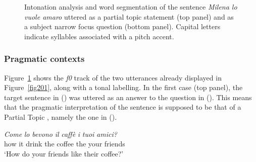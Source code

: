 \begin{figure}
\centering
{}
\caption{Intonation analysis and word segmentation of the sentence \textit{Milena lo vuole amaro} uttered as a partial topic statement (top panel) and as a subject narrow focus question (bottom panel). Capital letters indicate syllables associated with a pitch accent.}
\label{fig202}\end{figure}

\subsubsection{Pragmatic contexts}\label{sec2121}
Figure~\ref{fig202} shows the \textit{f0} track of the two utterances already displayed in Figure~\ref{fig201}, along with a tonal labelling. In the first case (top panel), the target sentence in () was uttered as an answer to the question in (). This means that the pragmatic interpretation of the sentence is supposed to be that of a Partial Topic \citep{buring1997meaning}, namely the one in ().

\ea
\gll \textit{Come} \textit{lo} \textit{bevono} \textit{il} \textit{caffè} \textit{i} \textit{tuoi} \textit{amici?}\footnotemark\\
how it drink the coffee the your friends\\
\glt ‘How do your friends like their coffee?’
\z


